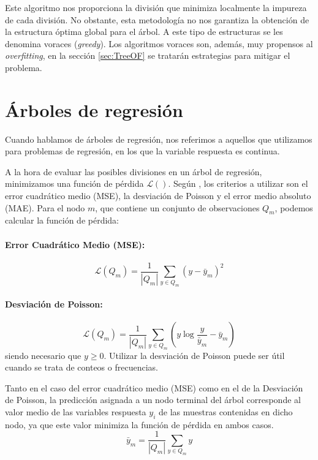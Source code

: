 \documentclass[titlepage, 11pt]{book}
\begin{document}
Este algoritmo nos proporciona la división que minimiza localmente la impureza de cada división. No obstante, esta metodología no nos garantiza la obtención de la estructura óptima global para el árbol. A este tipo de estructuras se les denomina voraces (\textit{greedy}). Los algoritmos voraces son, además, muy propensos al \textit{overfitting}, en la sección \ref{sec:TreeOF} se tratarán estrategias para mitigar el problema.


\section{Árboles de regresión}
Cuando hablamos de árboles de regresión, nos referimos a aquellos que utilizamos para problemas de regresión, en los que la variable respuesta es continua.

A la hora de evaluar las posibles divisiones en un árbol de regresión, minimizamos una función de pérdida $\mathcal{L}()$. Según \cite{scikit-learn}, los criterios a utilizar son el error cuadrático medio (MSE), la desviación de Poisson y el error medio absoluto (MAE). Para el nodo $m$, que contiene un conjunto de observaciones $Q_m$, podemos calcular la función de pérdida:
\paragraph*{Error Cuadrático Medio (MSE):}
\begin{equation*}
    \mathcal{L}(Q_m)=\frac{1}{|Q_m|}\sum_{y \in Q_m}(y-\bar{y}_m)^2
\end{equation*}

\paragraph*{Desviación de Poisson:}
\begin{equation*}
    \mathcal{L}(Q_m)=\frac{1}{|Q_m|}\sum_{y \in Q_m}(y \log{\frac{y}{\bar{y}_m}}-\bar{y}_m)
\end{equation*}
siendo necesario que $y \geq 0$. Utilizar la desviación de Poisson puede ser útil cuando se trata de conteos o frecuencias.

Tanto en el caso del error cuadrático medio (MSE) como en el de la Desviación de Poisson, la predicción asignada a un nodo terminal del árbol corresponde al valor medio de las variables respuesta $y_i$ de las muestras contenidas en dicho nodo, ya que este valor minimiza la función de pérdida en ambos casos.
\begin{equation*}
    \bar{y}_m=\frac{1}{|Q_m|}\sum_{y \in Q_m}y
\end{equation*}
\end{document}
